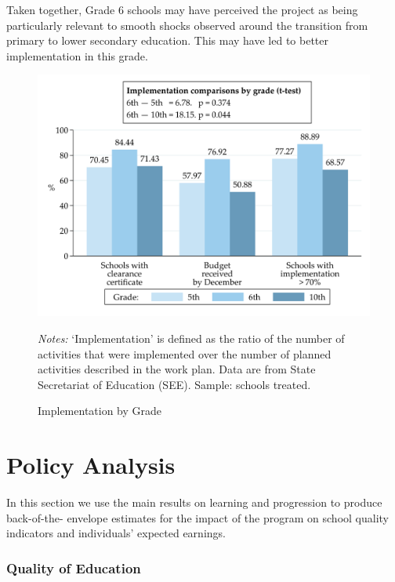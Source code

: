 \documentclass[11pt,a4paper]{article}
\begin{document}
Taken together, Grade 6 schools may have perceived the project as being particularly relevant to smooth shocks observed around the transition from primary to lower secondary education. This may have led to better implementation in this grade. 

\begin{figure}[ht!]
    \caption{Implementation by Grade}
    \label{fig:implementation_byGrade}
    \centering
    \includegraphics[width=14cm]{DataWork/Output/Figures/fig6-implementation_byGrade.png}
    \begin{minipage}{0.825\textwidth}
        \small{\textit{Notes:} `Implementation' is defined as the ratio of the number of activities that were implemented over the number of planned activities described in the work plan. Data are from State Secretariat of Education (SEE). Sample: schools treated.}
    \end{minipage}
\end{figure}
\FloatBarrier


\section{Policy Analysis} \label{sec:policy}

In this section we use the main results on learning and progression to produce back-of-the- envelope estimates for the impact of the program on school quality indicators and individuals' expected earnings.

\subsubsection*{Quality of Education} 
\end{document}
